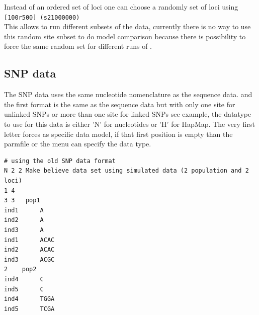 Instead of an ordered set of loci one can choose a randomly set of loci using\\
\texttt{[100r500] (s21000000)}\\
This allows to run different subsets of the data, currently there is no way to use this random site subset to do model comparison because there is possibility to force the same random set for different runs of \migrate.
\newpage
\subsection{SNP data}
The SNP data uses the same nucleotide nomenclature as the sequence data.
and the first format is the same as the sequence data but with only one site for unlinked SNPs or more than one site
for linked SNPs see example, the datatype to use for this data is either 'N' for nucleotides or 'H' for HapMap.
The very first letter forces as specific data model, if that first position is empty than the parmfile or the menu can specify the data type.
\begin{flushleft}
\begin{small}
\begin{tt}
\begin{verbatim}
# using the old SNP data format
N 2 2 Make believe data set using simulated data (2 population and 2 loci)
1 4 
3 3   pop1 
ind1      A
ind2      A
ind3      A
ind1      ACAC
ind2      ACAC
ind3      ACGC
2    pop2
ind4      C
ind5      C
ind4      TGGA
ind5      TCGA
\end{verbatim}
\end{tt}
\end{small}
\end{flushleft}


